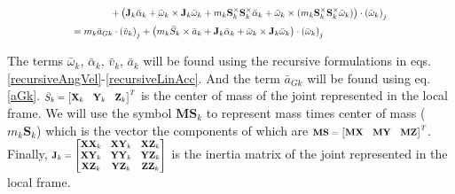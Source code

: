 \documentclass[a4paper,10pt]{article}
\newcommand\scalemath[2]{\scalebox{#1}{\mbox{\ensuremath{\displaystyle #2}}}}
\begin{document}
\begin{align}
 &\scalemath{0.775}{\hspace{40pt}+\left(\mathbf{J}_{k} \bar{\alpha}_k + \bar{\omega}_k \times \mathbf{J}_{k} \bar{\omega}_k + m_k\mathbf{S}^{\times}_k\mathbf{S}^{\times}_k\bar{\alpha}_k + \bar{\omega}_k \times (m_k\mathbf{S}^{\times}_k\mathbf{S}^{\times}_k \bar{\omega}_k)\right) \cdot \left( \bar\omega_k \right)_j} \nonumber \\
 &\scalemath{0.775}{=  m_k \bar{a}_{Gk} \cdot \left(\bar{v}_k\right)_j + \left( m_k \bar{S}_k \times \bar{a}_k + \mathbf{J}_{k} \bar{\alpha}_k + \bar{\omega}_k \times \mathbf{J}_{k} \bar{\omega}_k\right) \cdot  \left(\bar{\omega}_k\right)_j} \label{kanesLHSTerm}
\end{align}

The terms $\bar\omega_k$, $\bar\alpha_k$, $\bar{v}_k$, $\bar{a}_k$ will be found using the recursive formulations in eqs. \ref{recursiveAngVel}-\ref{recursiveLinAcc}. And the 
term $\bar{a}_{Gk}$ will be found using eq.\ref{aGk}. $\scalemath{0.75}{\bar{S}_k=\left[\begin{matrix} \mathbf{X}_k & \mathbf{Y}_k & \mathbf{Z}_k \end{matrix}\right]^T}$ 
is the center of mass of the joint represented in the local frame. We will use the symbol $\mathbf{MS}_k$ to represent mass times center of mass ($m_k\mathbf{S}_k$) which is
the vector the components of which are $\scalemath{0.75}{\mathbf{MS}=\left[\begin{matrix} \mathbf{MX} & \mathbf{MY} & \mathbf{MZ} \end{matrix}\right]^T}$. 
Finally, $\scalemath{0.75}{\mathbf{J}_k=\left[\begin{matrix} \mathbf{XX}_k & \mathbf{XY}_k & \mathbf{XZ}_k \\ \mathbf{XY}_k & \mathbf{YY}_k & \mathbf{YZ}_k \\ \mathbf{XZ}_k & \mathbf{YZ}_k & \mathbf{ZZ}_k \end{matrix}\right]}$
is the inertia matrix of the joint represented in the local frame.
\end{document}
